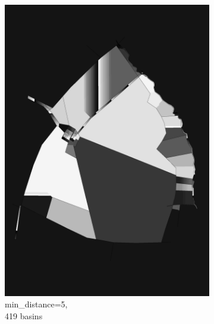\documentclass[12pt]{article}
\begin{document}
\begin{figure}[H]
	\begin{subfigure}[b]{.3\textwidth}
		\centering
		\includegraphics[width=1\linewidth]{images/polygon_recovery/watershed2_distance5_b419.png}  
		\caption{min\_distance=5, \\ 419 basins}
	\end{subfigure}
	\begin{subfigure}[b]{.3\textwidth}
		\centering

\end{subfigure}
\end{figure}
\end{document}
